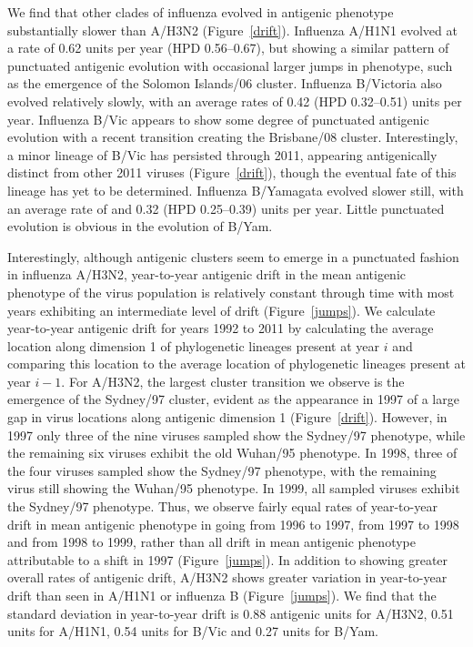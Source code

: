 \documentclass[11pt,oneside,letterpaper]{article}
\begin{document}
We find that other clades of influenza evolved in antigenic phenotype substantially slower than A/H3N2 (Figure~\ref{drift}).
Influenza A/H1N1 evolved at a rate of 0.62 units per year (HPD 0.56--0.67), but showing a similar pattern of punctuated antigenic evolution with occasional larger jumps in phenotype, such as the emergence of the Solomon Islands/06 cluster.  
Influenza B/Victoria also evolved relatively slowly, with an average rates of 0.42 (HPD 0.32--0.51) units per year.
Influenza B/Vic appears to show some degree of punctuated antigenic evolution with a recent transition creating the Brisbane/08 cluster.
Interestingly, a minor lineage of B/Vic has persisted through 2011, appearing antigenically distinct from other 2011 viruses (Figure~\ref{drift}), though the eventual fate of this lineage has yet to be determined.
Influenza B/Yamagata evolved slower still, with an average rate of and 0.32 (HPD 0.25--0.39) units per year.
Little punctuated evolution is obvious in the evolution of B/Yam.

Interestingly, although antigenic clusters seem to emerge in a punctuated fashion in influenza A/H3N2, year-to-year antigenic drift in the mean antigenic phenotype of the virus population is relatively constant through time with most years exhibiting an intermediate level of drift (Figure~\ref{jumps}).
We calculate year-to-year antigenic drift for years 1992 to 2011 by calculating the average location along dimension 1 of phylogenetic lineages present at year $i$ and comparing this location to the average location of phylogenetic lineages present at year $i-1$.
For A/H3N2, the largest cluster transition we observe is the emergence of the Sydney/97 cluster, evident as the appearance in 1997 of a large gap in virus locations along antigenic dimension 1 (Figure~\ref{drift}).
However, in 1997 only three of the nine viruses sampled show the Sydney/97 phenotype, while the remaining six viruses exhibit the old Wuhan/95 phenotype.
In 1998, three of the four viruses sampled show the Sydney/97 phenotype, with the remaining virus still showing the Wuhan/95 phenotype.
In 1999, all sampled viruses exhibit the Sydney/97 phenotype.
Thus, we observe fairly equal rates of year-to-year drift in mean antigenic phenotype in going from 1996 to 1997, from 1997 to 1998 and from 1998 to 1999, rather than all drift in mean antigenic phenotype attributable to a shift in 1997 (Figure~\ref{jumps}).
In addition to showing greater overall rates of antigenic drift, A/H3N2 shows greater variation in year-to-year drift than seen in A/H1N1 or influenza B (Figure~\ref{jumps}).
We find that the standard deviation in year-to-year drift is 0.88 antigenic units for A/H3N2, 0.51 units for A/H1N1, 0.54 units for B/Vic and 0.27 units for B/Yam.
\end{document}
